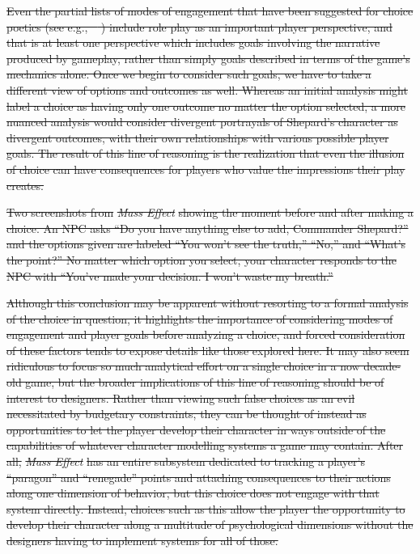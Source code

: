 \documentclass[arts,article,submit,moreauthors,pdftex,10pt,a4paper]{Definitions/mdpi}
\providecommand{\DIFdel}[1]{{\protect\color{red}\sout{#1}}}                      %
\providecommand{\DIFdelFL}[1]{\DIFdel{#1}} %
\begin{document}
\DIFdel{Even the partial lists of modes of engagement that have been suggested for choice poetics (see e.g., \mbox{%
\cite{mawhorter2014towards}}\hspace{0pt}%
) include role play as an important player perspective, and that is at least one perspective which includes goals involving the narrative produced by gameplay, rather than simply goals described in terms of the game's mechanics alone.
Once we begin to consider such goals, we have to take a different view of options and outcomes as well.
Whereas an initial analysis might label a choice as having only one outcome no matter the option selected, a more nuanced analysis would consider divergent portrayals of Shepard's character as divergent outcomes, with their own relationships with various possible player goals.
The result of this line of reasoning is the realization that even the illusion of choice can have consequences for players who value the impressions their play creates.
}%

{%
\DIFdelFL{Two screenshots from }\emph{\DIFdelFL{Mass Effect}} %
\DIFdelFL{showing the moment before and after making a choice. An NPC asks ``Do you have anything else to add, Commander Shepard?'' and the options given are labeled ``You won't see the truth,'' ``No,'' and ``What's the point?'' No matter which option you select, your character responds to the NPC with ``You've made your decision. I won't waste my breath.''}}

\DIFdel{Although this conclusion may be apparent without resorting to a formal analysis of the choice in question, it highlights the importance of considering modes of engagement and player goals before analyzing a choice, and forced consideration of these factors tends to expose details like those explored here.
It may also seem ridiculous to focus so much analytical effort on a single choice in a now decade-old game, but the broader implications of this line of reasoning should be of interest to designers.
Rather than viewing such false choices as an evil necessitated by budgetary constraints, they can be thought of instead as opportunities to let the player develop their character in ways outside of the capabilities of whatever character modelling systems a game may contain.
After all, }\emph{\DIFdel{Mass Effect}} %
\DIFdel{has an entire subsystem dedicated to tracking a player's ``paragon'' and ``renegade'' points and attaching consequences to their actions along one dimension of behavior, but this choice does not engage with that system directly.
Instead, choices such as this allow the player the opportunity to develop their character along a multitude of psychological dimensions without the designers having to implement systems for all of those.
}%
\end{document}
